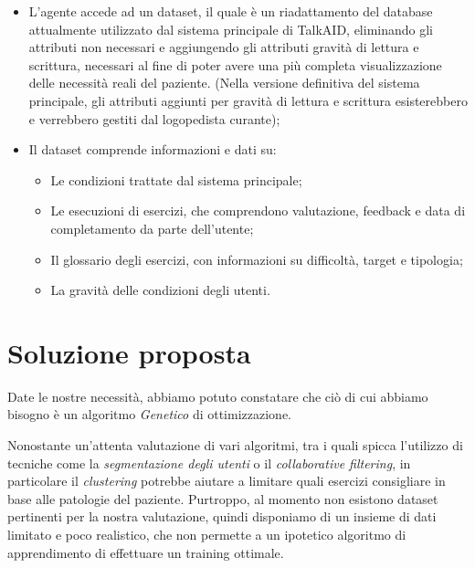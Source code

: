 \documentclass{article}
\begin{document}
    \begin{itemize}
        \item L'agente accede ad un dataset, il quale è un riadattamento del database attualmente utilizzato dal sistema principale di TalkAID, eliminando gli attributi non necessari e aggiungendo gli attributi gravità di lettura e scrittura, necessari al fine di poter avere una più completa visualizzazione delle necessità reali del paziente. (Nella versione definitiva del sistema principale, gli attributi aggiunti per gravità di lettura e scrittura esisterebbero e verrebbero gestiti dal logopedista curante);

        \item Il dataset comprende informazioni e dati su:
            \begin{itemize}
                \item Le condizioni trattate dal sistema principale;
                \item Le esecuzioni di esercizi, che comprendono valutazione, feedback e data di completamento da parte dell'utente;
                \item Il glossario degli esercizi, con informazioni su difficoltà, target e tipologia;
                \item La gravità delle condizioni degli utenti.
            \end{itemize}



    \end{itemize}

    \pagebreak

    \section{Soluzione proposta}

    Date le nostre necessità, abbiamo potuto constatare che ciò di cui abbiamo bisogno è un algoritmo \textit{Genetico} di ottimizzazione.

    Nonostante un'attenta valutazione di vari algoritmi, tra i quali spicca l'utilizzo di tecniche come la \textit{segmentazione degli utenti} o il \textit{collaborative filtering}, in particolare il \textit{clustering} potrebbe aiutare a limitare quali esercizi consigliare in base alle patologie del paziente. Purtroppo, al momento non esistono dataset pertinenti per la nostra valutazione, quindi disponiamo di un insieme di dati limitato e poco realistico, che non permette a un ipotetico algoritmo di apprendimento di effettuare un training ottimale.
\end{document}
